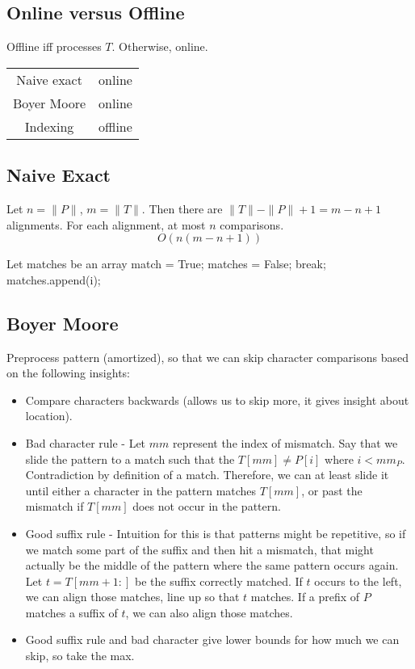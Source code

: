 \documentclass{article}
\begin{document}
\subsection{Online versus Offline}
Offline iff processes $T$. Otherwise, online.
\begin{tabular}{|c|c|}
    Naive exact & online \\
    Boyer Moore & online\\
    Indexing & offline
\end{tabular}

\subsection{Naive Exact}
Let $n=\|P\|$, $m=\|T\|$. Then there are $\|T\|-\|P\|+1 = m-n+1$ alignments. For each alignment, at most $n$ comparisons.
$$O(n(m-n+1))$$
\begin{algorithmic}
\State Let matches be an array
    \State match = True;
            \State matches = False; break;
        \EndIf
    \EndFor
        \State matches.append(i);
    \EndIf
\EndFor
\EndFunction
\end{algorithmic}

\subsection{Boyer Moore}
Preprocess pattern (amortized), so that we can skip character comparisons based on the following insights:
\begin{itemize}
    \item Compare characters backwards (allows us to skip more, it gives insight about location).
    \item Bad character rule - Let $mm$ represent the index of mismatch. Say that we slide the pattern to a match such that the $T[mm] \neq P[i]$ where $i < mm_P$. Contradiction by definition of a match. Therefore, we can at least slide it until either a character in the pattern matches $T[mm]$, or past the mismatch if $T[mm]$ does not occur in the pattern.\\
    \item Good suffix rule - Intuition for this is that patterns might be repetitive, so if we match some part of the suffix and then hit a mismatch, that might actually be the middle of the pattern where the same pattern occurs again. Let $t=T[mm+1:]$ be the suffix correctly matched. If $t$ occurs to the left, we can align those matches, line up so that $t$ matches. If a prefix of $P$ matches a suffix of $t$, we can also align those matches.
    \item Good suffix rule and bad character give lower bounds for how much we can skip, so take the max.
\end{itemize}
\end{document}
